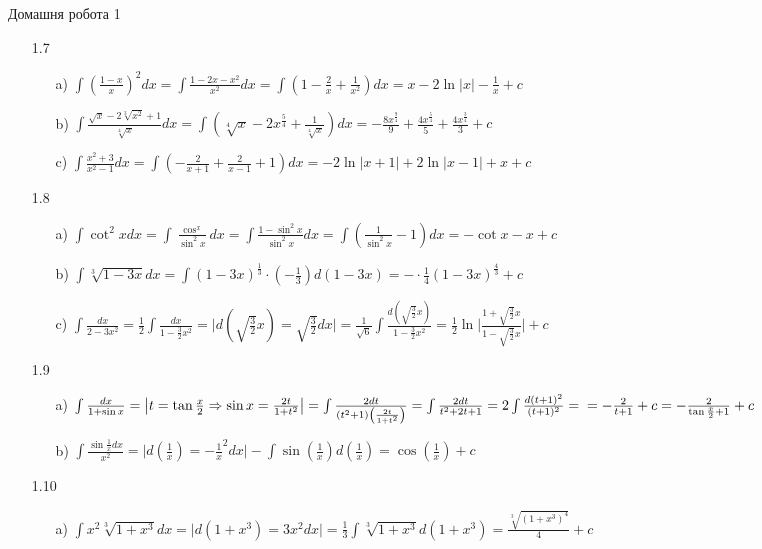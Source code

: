 \documentclass[a4paper,12pt]{article}
\begin{document}
\begin{center}
{\LARGE Домашня робота 1}	
\end{center}
\begin{itemize}
	\item [1.7]\begin{itemize}
	\item [a)] $\int \left( \frac{1-x}{x} \right)^2dx=\int \frac{1-2x-x^2}{x^2}dx=\int( 1 -\frac{2}{x}+\frac{1}{x^2})dx=x-2\ln|x|-\frac{1}{x}+c$ 
	\item [b)] $\int \frac{\sqrt{x}-2\sqrt[3]{x^2}+1}{\sqrt[4]x} dx=\int (\sqrt[4]x-2x^{\frac54}+\frac1{\sqrt[4]x})dx=-\frac{8x^{\frac94}}{9}+\frac{4x^{\frac54}}{5}+\frac{4x^{\frac34}}{3}+c$
	\item [c)] $\int\frac{x^2+3}{x^2-1}dx=\int (-\frac2{x+1}+\frac2{x-1}+1)dx=-2\ln|x+1|+2\ln|x-1|+x+c$
	\end{itemize}
	\item [1.8] \begin{itemize}
	\item  [a)] $\int \cot^2xdx=\int \frac{\cos^x}{\sin^2x}dx=\int \frac{1-\sin^2x}{\sin^2x}dx=\int (\frac1{\sin^2x}-1)dx=-\cot x-x+c$
	\item [b)] $\int \sqrt[3]{1-3x}dx=\int (1-3x)^{\frac13}\cdot(-\frac13)d(1-3x)=-\cdot \frac14(1-3x)^{\frac43}+c$
	\item [c)] $\int\frac{dx}{2-3x^2}=\frac12\int\frac{dx}{1-\frac32x^2}=\Big| d(\sqrt{\frac32}x)=\sqrt{\frac32}dx\Big|=\frac{1}{\sqrt{6}}\int\frac{d(\sqrt{\frac{3}{2}}x)}{1-\frac32x^2}=\frac12\ln\Big|\frac{1+\sqrt{\frac32}x}{1-\sqrt{\frac32}x}\Big|+c$
	\end{itemize}
	\item [1.9] \begin{itemize} 
	\item [a)] $\int\frac{dx}{1+\sin x}=\big|t=\tan \frac x2\Rightarrow \sin x=\frac{2t}{1+t^2}\big|=\int \frac{2 dt}{(t^2+1)\left(\frac{2t}{1+t^2}\right)}=\int\frac{2dt}{t^2+2t+1}=2\int \frac{d(t+1)^2}{(t+1)^2}=\\=-\frac2{t+1}+c=-\frac2{\tan\frac x2+1}+c$
	\item [b)] $\int \frac {\sin\frac1x dx}{x^2}=\big|d(\frac1x)=-\frac1x^2 dx\big|-\int \sin (\frac1x)d(\frac1x)=\cos(\frac1x)+c$
	\end{itemize}
	\item[1.10]\begin{itemize} 
	\item [a)] $\int x^2\sqrt[3]{1+x^3}dx=\big|d(1+x^3)=3x^2dx\big|=\frac13\int\sqrt[3]{1+x^3}d(1+x^3)=\frac{\sqrt[3]{(1+x^3)^4}}{4}+c$

\end{itemize}
\end{itemize}
\end{document}
